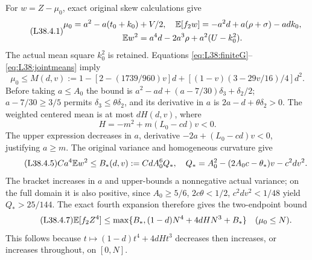 For $w=Z-\mu_0$, exact original skew calculations give
\begin{equation}\tag{L38.4.1}\label{eq:L38:exact}
\begin{gathered}
\mu_0=a^2-a(t_0+k_0)+V/2,\quad \mathbb E[f_2w]=-a^2d+a(\rho+\sigma)-adk_0,\\
\mathbb E w^2=a^4d-2a^3\rho+a^2(U-k_0^2).
\end{gathered}
\end{equation}
The actual mean square $k_0^2$ is retained.
Equations \eqref{eq:L38:finiteG}--\eqref{eq:L38:jointmeans} imply
\begin{equation}\tag{L38.4.3}\label{eq:L38:M}
\mu_0\le M(d,v):=1-[2-(1739/960)v]d
+[(1-v)(3-29v/16)/4]d^2.
\end{equation}
Before taking $a\le A_0$ the bound is
$a^2-ad+(a-7/30)\delta_3+\delta_2/2$;
$a-7/30\ge3/5$ permits $\delta_3\le\theta\delta_2$,
and its derivative in $a$ is $2a-d+\theta\delta_2>0$.
The weighted centered mean is at most $dH(d,v)$, where
\[
H=-m^2+m(L_0-cd)v<0.
\]
The upper expression decreases in $a$, derivative
$-2a+(L_0-cd)v<0$, justifying $a\ge m$.
The original variance and homogeneous curvature give
\begin{equation}\tag{L38.4.5}\label{eq:L38:B}
Ca^4\mathbb E w^2\le B_*(d,v):=CdA_0^6Q_*,\quad
Q_*=A_0^2-(2A_0c-\theta_*)v-c^2dv^2.
\end{equation}
The bracket increases in $a$ and upper-bounds a nonnegative actual
variance; on the full domain it is also positive, since
$A_0\ge5/6$, $2c\theta<1/2$, $c^2dv^2<1/48$ yield
$Q_*>25/144$.
The exact fourth expansion therefore gives the two-endpoint bound
\begin{equation}\tag{L38.4.7}\label{eq:L38:endpoints}
\mathbb E[f_2Z^4]\le\max\{B_*,(1-d)N^4+4dHN^3+B_*\}
\quad(\mu_0\le N).
\end{equation}
This follows because $t\mapsto(1-d)t^4+4dHt^3$ decreases then
increases, or increases throughout, on $[0,N]$.

